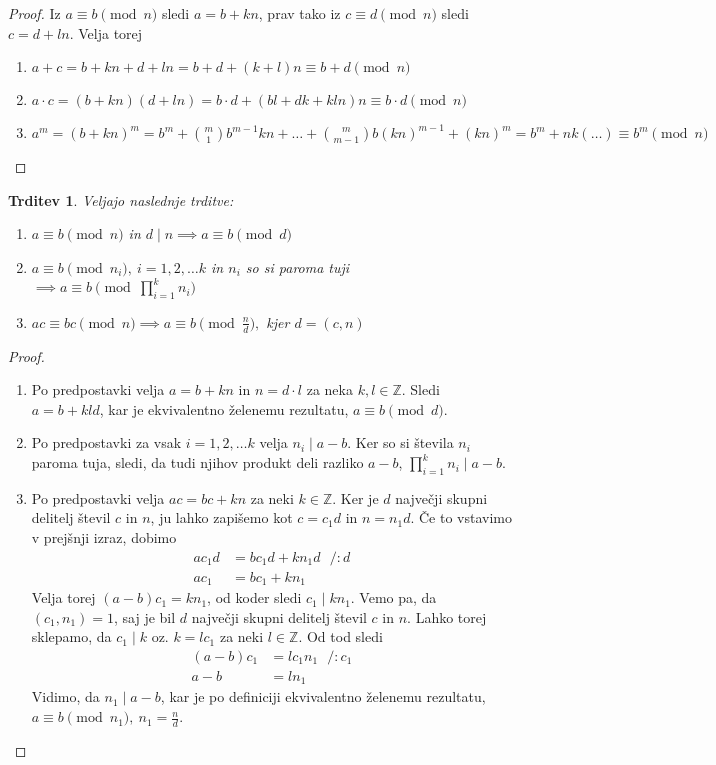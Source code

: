\documentclass[12pt, a4paper]{article}
\newtheorem{trd}{Trditev}
\begin{document}
\begin{proof}
Iz $a\equiv b \pmod n$ sledi $a=b+kn$, prav tako iz $c\equiv d \pmod n$ sledi $c=d+ln$. Velja torej
\begin{enumerate}
\item $a+c=b+kn + d + ln= b+d +(k+l)n \equiv b+d \pmod n$
\item $a\cdot c=(b+kn)(d+ln)=b\cdot d +(bl+dk+kln)n\equiv b\cdot d\pmod n$
\item $a^{m}=(b+kn)^{m}=b^{m}+\binom{m}{1}b^{m-1}kn+\dots+\binom{m}{m-1}b(kn)^{m-1} + (kn)^{m}=b^{m}+nk(\ldots)\equiv b^{m} \pmod n$
\end{enumerate}
\end{proof}

\begin{trd}
\label{osnovne}
Veljajo naslednje trditve:
\begin{enumerate}
\item $a\equiv b \pmod n$ in $d\mid n \implies a\equiv b\pmod d$
\item $a\equiv b \pmod{n_{i}},\ i=1,2,\ldots k$ in $n_{i}$ so si paroma tuji$\implies a\equiv b\pmod {\prod_{i=1}^{k} n_{i}}$
\item $ac\equiv bc\pmod n \implies a\equiv b\pmod{\frac{n}{d}},$ kjer $d=(c,n)$
\end{enumerate}
\end{trd}

\begin{proof}
\begin{enumerate}
\item Po predpostavki velja $a=b+kn$ in $n=d\cdot l$ za neka $k,l\in \mathbb{Z}$. Sledi $a=b+kld$, kar je ekvivalentno želenemu rezultatu, $a\equiv b \pmod d$.
\item Po predpostavki za vsak $i=1,2,\ldots k$ velja $n_{i} \mid a-b$. Ker so si števila $n_{i}$ paroma tuja, sledi, da tudi njihov produkt deli razliko $a-b$, $\prod_{i=1}^{k} n_{i}\mid a-b$.
\item Po predpostavki velja $ac=bc+kn$ za neki $k\in \mathbb{Z}$. Ker je $d$ največji skupni delitelj števil $c$ in $n$, ju lahko zapišemo kot $c=c_{1}d$ in $n=n_{1}d$. Če to vstavimo v prejšnji izraz, dobimo
\begin{align*}
ac_{1}d&=bc_{1}d+kn_{1}d \ \ \ /:d \\
ac_{1}&= bc_{1} + kn_{1}
\end{align*}
Velja torej $(a-b)c_{1}=kn_{1}$, od koder sledi $c_{1}\mid kn_{1}$. Vemo pa, da $(c_{1},n_{1})=1$, saj je bil $d$ največji skupni delitelj števil $c$ in $n$. Lahko torej sklepamo, da $c_{1}\mid k$ oz. $k=lc_{1}$ za neki $l\in \mathbb{Z}$. Od tod sledi
\begin{align*}
(a-b)c_{1}&=lc_{1}n_{1} \ \ \ /:c_{1} \\
a-b&=ln_{1}
\end{align*}
Vidimo, da $n_{1}\mid a-b$, kar je po definiciji ekvivalentno želenemu rezultatu, $a\equiv b \pmod{n_{1}},\  n_{1}=\frac{n}{d}$.
\end{enumerate}
\end{proof}
\end{document}
